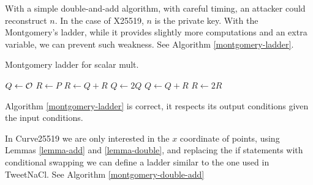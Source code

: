 
With a simple double-and-add algorithm, with careful timing, an attacker could reconstruct $n$.
In the case of X25519, $n$ is the private key. With the Montgomery's ladder, while
it provides slightly more computations and an extra variable, we can prevent such weakness.
See Algorithm \ref{montgomery-ladder}.

\begin{algorithm}
\caption{Montgomery ladder for scalar mult.}
\label{montgomery-ladder}
\begin{algorithmic}
\STATE $Q \leftarrow \mathcal{O}$
\STATE $R \leftarrow P$
    \STATE $R \leftarrow Q + R$
    \STATE $Q \leftarrow 2Q$
  \ELSE
    \STATE $Q \leftarrow Q + R$
    \STATE $R \leftarrow 2R$
  \ENDIF
\ENDFOR
\end{algorithmic}
\end{algorithm}

\begin{lemma}
\label{lemma-montgomery-ladder}
Algorithm \ref{montgomery-ladder} is correct, \ie it respects its output conditions given the input conditions.
\end{lemma}

In Curve25519 we are only interested in the $x$ coordinate of points, using
Lemmas \ref{lemma-add} and \ref{lemma-double}, and replacing the if statements
with conditional swapping we can define a ladder similar to the one used in TweetNaCl.
See Algorithm \ref{montgomery-double-add}

